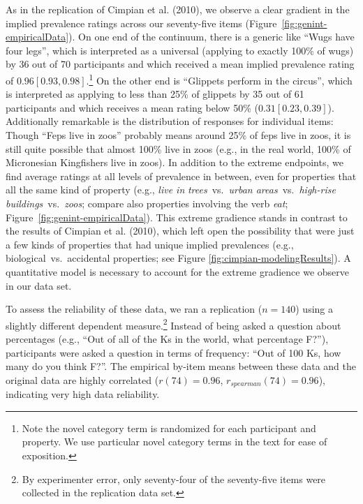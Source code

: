 \documentclass[floatsintext,doc]{apa6}
\let\rmarkdownfootnote\footnote%
\def\footnote{\protect\rmarkdownfootnote}
\newcommand{\ndg}[1]{{\textcolor{Green}{[ndg: #1]}}}
\begin{document}
As in the replication of Cimpian et al. (2010), we observe a clear gradient in the implied prevalence ratings across our seventy-five items (Figure~\ref{fig:genint-empiricalData}).
On one end of the continuum, there is a generic like \enquote{Wugs have four legs}, which is interpreted as a universal (applying to exactly 100\% of wugs) by 36 out of 70 participants and which received a mean implied prevalence rating of \(0.96 [0.93, 0.98]\).\footnote{Note the novel category term is randomized for each participant and property.
  We use particular novel category terms in the text for ease of exposition.}
On the other end is \enquote{Glippets perform in the circus}, which is interpreted as applying to less than 25\% of glippets by 35 out of 61 participants and which receives a mean rating below 50\% (\(0.31 [0.23, 0.39]\)).
Additionally remarkable is the distribution of responses for individual items: Though \enquote{Feps live in zoos} probably means around 25\% of feps live in zoos, it is still quite possible that almost 100\% live in zoos (e.g., in the real world, 100\% of Micronesian Kingfishers live in zoos).
In addition to the extreme endpoints, we find average ratings at all levels of prevalence in between, even for properties that all the same kind of property (e.g., \emph{live in} \emph{trees}~vs.~\emph{urban areas}~vs.~\emph{high-rise buildings}~vs.~\emph{zoos}; compare also properties involving the verb \emph{eat}; Figure~\ref{fig:genint-empiricalData}).
This extreme gradience stands in contrast to the results of Cimpian et al. (2010), which left open the possibility that were just a few kinds of properties that had unique implied prevalences (e.g., biological~vs.~accidental properties; see Figure \ref{fig:cimpian-modelingResults}). 
A quantitative model is necessary to account for the extreme gradience we observe in our data set.


To assess the reliability of these data, we ran a replication (\(n=140\)) using a slightly different dependent measure.\footnote{By experimenter error, only seventy-four of the seventy-five items were collected in the replication data set.}
Instead of being asked a question about percentages (e.g., \enquote{Out of all of the Ks in the world, what percentage F?}), participants were asked a question in terms of frequency: \enquote{Out of 100 Ks, how many do you think F?}.
The empirical by-item means between these data and the original data are highly correlated (\(r(74) = 0.96\), \(r_{spearman}(74)= 0.96\)), indicating very high data reliability.
\end{document}

